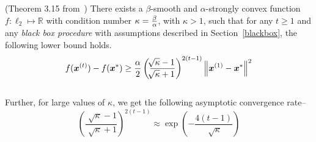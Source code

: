 \documentclass{article}
\begin{document}
\begin{thm}
\label{thethm}
(Theorem 3.15 from~\cite{bubeck})
There exists a $\beta$-smooth and $\alpha$-strongly convex function $f \colon \ell_2 \mapsto \mathbb{R}$ with condition number $\kappa = {\beta \over \alpha}$, with $\kappa > 1$, such that for any $t \geq 1$ and any \emph{black box procedure} with assumptions described in Section~\ref{blackbox}, the following lower bound holds.
\begin{equation}
    f({\bm{x}}^{(t)}) - f({\bm{x}}^\ast) \geq {\alpha \over 2}  \left( \frac{\sqrt[]{\kappa} - 1}{\sqrt[]{\kappa} + 1} \right)^{2(t-1)}  
    \left\lVert {\bm{x}}^{(1)} - {\bm{x}}^\ast\right\rVert^2
\end{equation} \\
Further, for large values of $\kappa$, we get the following asymptotic convergence rate--\\
\begin{equation}
 \left(\frac{\sqrt[]{\kappa} - 1}{\sqrt[]{\kappa} + 1} \right)^{2(t-1)} \approx \exp{ \left(-\frac{4(t-1)}{\sqrt[]{\kappa}}\right)}
\end{equation}
\end{thm}
\end{document}
